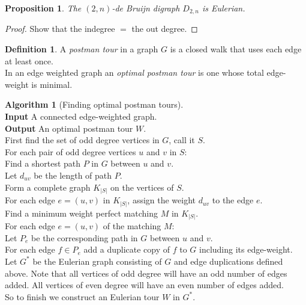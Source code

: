 \documentclass{article}
\newtheorem*{prop}{Proposition}
\theoremstyle{definition}
\newtheorem*{defn}{Definition}
\newtheorem*{alg}{Algorithm}
\begin{document}
\begin{prop}
The $(2,n)$-de Bruijn digraph $D_{2,n}$ is Eulerian.
\end{prop}

\begin{proof}
Show that the indegree $=$ the out degree.
\end{proof}


\begin{defn}
A \emph{postman tour} in a graph $G$ is a closed walk that uses each edge at least once. \\
In an edge weighted graph an \emph{optimal postman tour} is one whose total edge-weight is minimal.
\end{defn}

\begin{alg}[Finding optimal postman tours]~\\
\textbf{Input} A connected edge-weighted graph. \\
\textbf{Output} An optimal postman tour $W$. \\
First find the set of odd degree vertices in $G$, call it $S$. \\
For each pair of odd degree vertices $u$ and $v$ in $S$: \\
\indent Find a shortest path $P$ in $G$ between $u$ and $v$. \\
\indent Let $d_{uv}$ be the length of path $P$. \\
Form a complete graph $K_{|S|}$ on the vertices of $S$.\\
For each edge $e = (u,v)$ in $K_{|S|}$, assign the weight $d_{uv}$ to the edge $e$.\\
Find a minimum weight perfect matching $M$ in $K_{|S|}$.\\
For each edge $e=(u,v)$ of the matching $M$: \\
\indent Let $P_e$ be the corresponding path in $G$ between $u$ and $v$. \\
\indent For each edge $f\in P_e$ add a duplicate copy of $f$ to $G$ including its edge-weight. \\
Let $G^*$ be the Eulerian graph consisting of $G$ and edge duplications defined above.
Note that all vertices of odd degree will have an odd number of edges added.
All vertices of even degree will have an even number of edges added. \\
So to finish we construct an Eulerian tour $W$ in $G^*$.
\end{alg}
\end{document}
